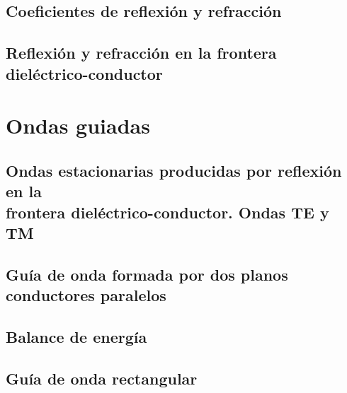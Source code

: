 \documentclass[a4paper]{book}
\numberwithin{figure}{chapter}
\numberwithin{equation}{chapter}
\begin{document}
\section{Coeficientes de reflexión y refracción}
\section[Reflexión y refracción en la frontera dieléctrico-conductor]{Reflexión y refracción en la frontera\\ dieléctrico-conductor}

\chapter{Ondas guiadas}
\section{\texorpdfstring{Ondas estacionarias producidas por reflexión en la\\ frontera dieléctrico-conductor. Ondas TE y TM}{Ondas estacionarias producidas por reflexión en la frontera dieléctrico-conductor. Ondas TE y TM}}
\section{Guía de onda formada por dos planos conductores paralelos}
\section{Balance de energía}
\section{Guía de onda rectangular}

% 
\end{document}
